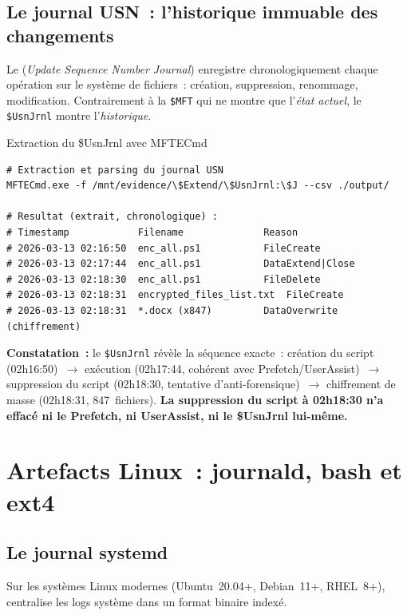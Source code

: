 \subsection{Le journal USN~: l'historique immuable des changements}

Le  (\textit{Update Sequence Number
Journal}) enregistre chronologiquement chaque opération sur le système
de fichiers~: création, suppression, renommage, modification.
Contrairement à la \texttt{\$MFT} qui ne montre que l'\emph{état actuel},
le \texttt{\$UsnJrnl} montre l'\emph{historique}.

\begin{boxoutils}{Extraction du \$UsnJrnl avec MFTECmd}
\begin{lstlisting}[language=bash_forensique]
# Extraction et parsing du journal USN
MFTECmd.exe -f /mnt/evidence/\$Extend/\$UsnJrnl:\$J --csv ./output/

# Resultat (extrait, chronologique) :
# Timestamp            Filename              Reason
# 2026-03-13 02:16:50  enc_all.ps1           FileCreate
# 2026-03-13 02:17:44  enc_all.ps1           DataExtend|Close
# 2026-03-13 02:18:30  enc_all.ps1           FileDelete
# 2026-03-13 02:18:31  encrypted_files_list.txt  FileCreate
# 2026-03-13 02:18:31  *.docx (x847)         DataOverwrite (chiffrement)
\end{lstlisting}
\textbf{Constatation~:} le \texttt{\$UsnJrnl} révèle la séquence
exacte~: création du script (02h16:50)~$\to$ exécution (02h17:44, cohérent
avec Prefetch/UserAssist)~$\to$ suppression du script (02h18:30, tentative
d'anti-forensique)~$\to$ chiffrement de masse (02h18:31, 847~fichiers).
\textbf{La suppression du script à 02h18:30 n'a effacé ni le Prefetch,
ni UserAssist, ni le \$UsnJrnl lui-même.}
\end{boxoutils}

\section{Artefacts Linux~: journald, bash et ext4}
\label{sec:artefacts-linux}

\subsection{Le journal systemd}

Sur les systèmes Linux modernes (Ubuntu~20.04+, Debian~11+, RHEL~8+),
 centralise les logs système dans
un format binaire indexé.

